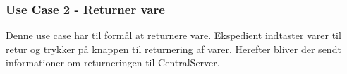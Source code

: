 \subsubsection{Use Case 2 - Returner vare}
Denne use case har til formål at returnere vare. Ekspedient indtaster varer til retur og trykker på knappen til returnering af varer. Herefter bliver der sendt informationer om returneringen til CentralServer.